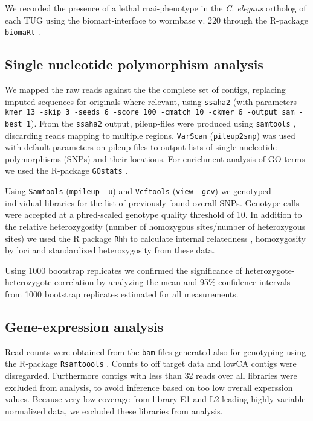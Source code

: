 \documentclass[10pt]{bmc_article}
\newenvironment{bmcformat}{\begin{raggedright}\baselineskip20pt\sloppy\setboolean{publ}{false}}{\end{raggedright}\baselineskip20pt\sloppy}
\begin{document}
\begin{bmcformat}
We recorded the presence of a lethal rnai-phenotype in the
\textit{C. elegans} ortholog of each TUG using the biomart-interface
\cite{pmid22083790} to wormbase v. 220 through the R-package
\texttt{biomaRt} \cite{pmid19617889}.

\subsection*{Single nucleotide polymorphism analysis}

We mapped the raw reads against the the complete set of contigs,
replacing imputed sequences for originals where relevant, using
\texttt{ssaha2} \cite{pmid11591649} (with parameters \texttt{-kmer 13
  -skip 3 -seeds 6 -score 100 -cmatch 10 -ckmer 6 -output sam -best
  1}). From the \texttt{ssaha2} output, pileup-files were produced
using \texttt{samtools} \cite{journals/bioinformatics/LiHWFRHMAD09},
discarding reads mapping to multiple regions. \texttt{VarScan}
\cite{pmid19542151} (\texttt{pileup2snp}) was used with default
parameters on pileup-files to output lists of single nucleotide
polymorphisms (SNPs) and their locations. For enrichment analysis of
GO-terms we used the R-package \texttt{GOstats} \cite{pmid17098774}.

Using \texttt{Samtools} \cite{journals/bioinformatics/LiHWFRHMAD09}
(\texttt{mpileup -u}) and \texttt{Vcftools} \cite{pmid21653522}
(\texttt{view -gcv}) we genotyped individual libraries for the list of
previously found overall SNPs. Genotype-calls were accepted at a
phred-scaled genotype quality threshold of 10. In addition to the
relative heterozygosity (number of homozygous sites/number of
heterozygous sites) we used the R package \texttt{Rhh}
\cite{pmid21565077} to calculate internal relatedness
\cite{pmid11571049}, homozygosity by loci \cite{pmid17107491} and
standardized heterozygosity \cite{coltman81j} from these data.

Using 1000 bootstrap replicates we confirmed the significance of
heterozygote-heterozygote correlation by analyzing the mean and 95\%
confidence intervals from 1000 bootstrap replicates estimated for all
measurements.

\subsection*{Gene-expression analysis}

Read-counts were obtained from the \texttt{bam}-files generated also
for genotyping using the R-package \texttt{Rsamtoools}
\cite{rsamtools}. Counts to off target data and lowCA contigs were
disregarded. Furthermore contigs with less than 32 reads over all
libraries were excluded from analysis, to avoid inference based on too
low overall experssion values. Because very low coverage from library
E1 and L2 leading highly variable normalized data, we excluded these
libraries from analysis.


\end{bmcformat}
\end{document}
